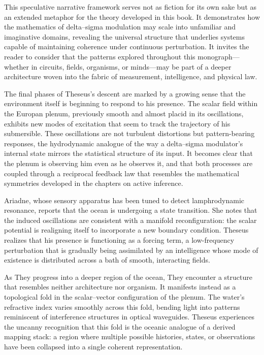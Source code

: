 This speculative narrative framework serves not as fiction for its own sake but as an extended metaphor for the theory developed in this book. It demonstrates how the mathematics of delta–sigma modulation may scale into unfamiliar and imaginative domains, revealing the universal structure that underlies systems capable of maintaining coherence under continuous perturbation. It invites the reader to consider that the patterns explored throughout this monograph—whether in circuits, fields, organisms, or minds—may be part of a deeper architecture woven into the fabric of measurement, intelligence, and physical law.


The final phases of Theseus’s descent are marked by a growing sense that the environment itself is beginning to respond to his presence. The scalar field within the Europan plenum, previously smooth and almost placid in its oscillations, exhibits new modes of excitation that seem to track the trajectory of his submersible. These oscillations are not turbulent distortions but pattern-bearing responses, the hydrodynamic analogue of the way a delta–sigma modulator’s internal state mirrors the statistical structure of its input. It becomes clear that the plenum is observing him even as he observes it, and that both processes are coupled through a reciprocal feedback law that resembles the mathematical symmetries developed in the chapters on active inference.

Ariadne, whose sensory apparatus has been tuned to detect lamphrodynamic resonance, reports that the ocean is undergoing a state transition. She notes that the induced oscillations are consistent with a manifold reconfiguration: the scalar potential is realigning itself to incorporate a new boundary condition. Theseus realizes that his presence is functioning as a forcing term, a low-frequency perturbation that is gradually being assimilated by an intelligence whose mode of existence is distributed across a bath of smooth, interacting fields.

As They progress into a deeper region of the ocean, They encounter a structure that resembles neither architecture nor organism. It manifests instead as a topological fold in the scalar–vector configuration of the plenum. The water’s refractive index varies smoothly across this fold, bending light into patterns reminiscent of interference structures in optical waveguides. Theseus experiences the uncanny recognition that this fold is the oceanic analogue of a derived mapping stack: a region where multiple possible histories, states, or observations have been collapsed into a single coherent representation.

